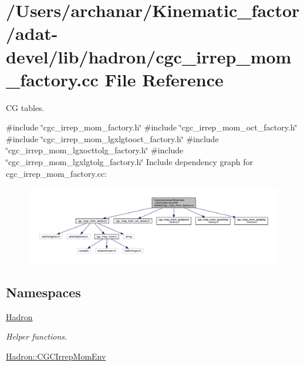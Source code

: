 \hypertarget{adat-devel_2lib_2hadron_2cgc__irrep__mom__factory_8cc}{}\section{/\+Users/archanar/\+Kinematic\+\_\+factor/adat-\/devel/lib/hadron/cgc\+\_\+irrep\+\_\+mom\+\_\+factory.cc File Reference}
\label{adat-devel_2lib_2hadron_2cgc__irrep__mom__factory_8cc}


CG tables.  


{\ttfamily \#include \char`\"{}cgc\+\_\+irrep\+\_\+mom\+\_\+factory.\+h\char`\"{}}\newline
{\ttfamily \#include \char`\"{}cgc\+\_\+irrep\+\_\+mom\+\_\+oct\+\_\+factory.\+h\char`\"{}}\newline
{\ttfamily \#include \char`\"{}cgc\+\_\+irrep\+\_\+mom\+\_\+lgxlgtooct\+\_\+factory.\+h\char`\"{}}\newline
{\ttfamily \#include \char`\"{}cgc\+\_\+irrep\+\_\+mom\+\_\+lgxocttolg\+\_\+factory.\+h\char`\"{}}\newline
{\ttfamily \#include \char`\"{}cgc\+\_\+irrep\+\_\+mom\+\_\+lgxlgtolg\+\_\+factory.\+h\char`\"{}}\newline
Include dependency graph for cgc\+\_\+irrep\+\_\+mom\+\_\+factory.\+cc\+:
\nopagebreak
\begin{figure}[H]
\begin{center}
\leavevmode
\includegraphics[width=350pt]{d1/d8a/adat-devel_2lib_2hadron_2cgc__irrep__mom__factory_8cc__incl}
\end{center}
\end{figure}
\subsection*{Namespaces}
\begin{DoxyCompactItemize}
\item 
 \mbox{\hyperlink{namespaceHadron}{Hadron}}
\begin{DoxyCompactList}\small\item\em Helper functions. \end{DoxyCompactList}\item 
 \mbox{\hyperlink{namespaceHadron_1_1CGCIrrepMomEnv}{Hadron\+::\+C\+G\+C\+Irrep\+Mom\+Env}}
\end{DoxyCompactItemize}

